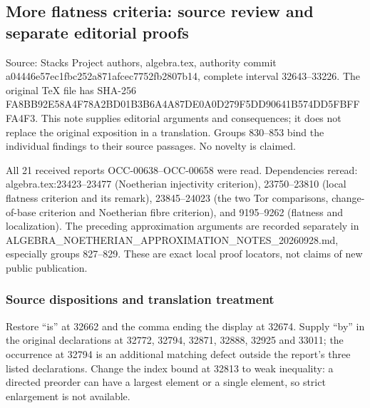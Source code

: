 \subsection{More flatness criteria: source review and separate editorial proofs}\label{algebra-proof-038-more-flatness-criteria-source-review-and-separate-editorial-proofs}

Source: Stacks Project authors, algebra.tex, authority commit a044\allowbreak{}46e5\allowbreak{}7ec1\allowbreak{}fbc2\allowbreak{}52a8\allowbreak{}71af\allowbreak{}cec7\allowbreak{}752f\allowbreak{}b280\allowbreak{}7b14, complete interval 32643--33226. The original TeX file has SHA-256 FA8B\allowbreak{}B92E\allowbreak{}58A4\allowbreak{}F78A\allowbreak{}2BD0\allowbreak{}1B3B\allowbreak{}6A4A\allowbreak{}87DE\allowbreak{}0A0D\allowbreak{}279F\allowbreak{}5DD9\allowbreak{}0641\allowbreak{}B574\allowbreak{}DD5F\allowbreak{}BFFF\allowbreak{}A4F3. This note supplies editorial arguments and consequences; it does not replace the original exposition in a translation. Groups 830--853 bind the individual findings to their source passages. No novelty is claimed.

All 21 received reports OCC-\AlgebraIdentifierBreak{}00638--\AlgebraIdentifierBreak{}OCC-\AlgebraIdentifierBreak{}00658 were read. Dependencies reread: algebra.\AlgebraIdentifierBreak{}tex:\AlgebraIdentifierBreak{}23423--\AlgebraIdentifierBreak{}23477 (Noetherian injectivity criterion), 23750--23810 (local flatness criterion and its remark), 23845--24023 (the two Tor comparisons, change-of-base criterion and Noetherian fibre criterion), and 9195--9262 (flatness and localization). The preceding approximation arguments are recorded separately in ALGEBRA\_\allowbreak{}NOETHERIAN\_\allowbreak{}APPROXIMATIO\allowbreak{}N\_\allowbreak{}NOTES\_\allowbreak{}20260928.\allowbreak{}md, especially groups 827--829. These are exact local proof locators, not claims of new public publication.

\subsubsection{Source dispositions and translation treatment}\label{algebra-proof-038-source-dispositions-and-translation-treatment}

Restore ``is'' at 32662 and the comma ending the display at 32674. Supply ``by'' in the original declarations at 32772, 32794, 32871, 32888, 32925 and 33011; the occurrence at 32794 is an additional matching defect outside the report's three listed declarations. Change the index bound at 32813 to weak inequality: a directed preorder can have a largest element or a single element, so strict enlargement is not available.

